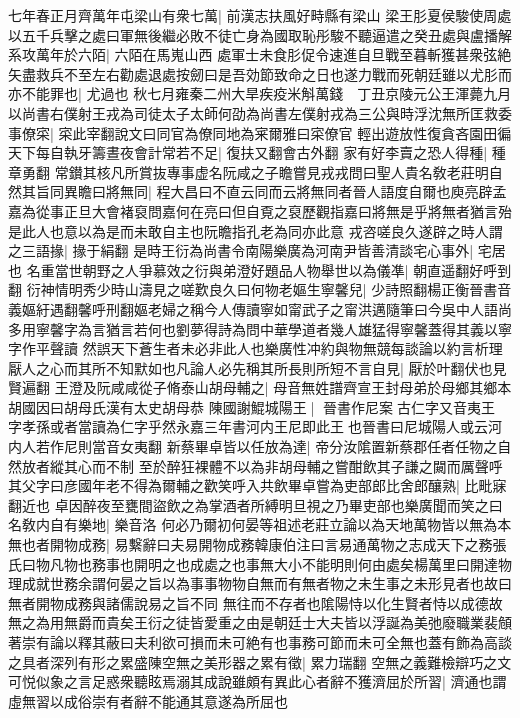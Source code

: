 七年春正月齊萬年屯梁山有衆七萬|{
	前漢志扶風好畤縣有梁山}
梁王肜夏侯駿使周處以五千兵擊之處曰軍無後繼必敗不徒亡身為國取恥彤駿不聽逼遣之癸丑處與盧播解系攻萬年於六陌|{
	六陌在馬嵬山西}
處軍士未食肜促令速進自旦戰至暮斬獲甚衆弦絶矢盡救兵不至左右勸處退處按劒曰是吾効節致命之日也遂力戰而死朝廷雖以尤肜而亦不能罪也|{
	尤過也}
秋七月雍秦二州大旱疾疫米斛萬錢　丁丑京陵元公王渾薨九月以尚書右僕射王戎為司徒太子太師何劭為尚書左僕射戎為三公與時浮沈無所匡救委事僚寀|{
	寀此宰翻說文曰同官為僚同地為宷爾雅曰寀僚官}
輕出遊放性復貪吝園田徧天下每自執牙籌晝夜會計常若不足|{
	復扶又翻會古外翻}
家有好李賣之恐人得種|{
	種章勇翻}
常鑚其核凡所賞抜專事虚名阮咸之子瞻嘗見戎戎問曰聖人貴名敎老莊明自然其旨同異瞻曰將無同|{
	程大昌曰不直云同而云將無同者晉人語度自爾也庾亮辟孟嘉為從事正旦大會褚裒問嘉何在亮曰但自覔之裒歷觀指嘉曰將無是乎將無者猶言殆是此人也意以為是而未敢自主也阮瞻指孔老為同亦此意}
戎咨嗟良久遂辟之時人謂之三語掾|{
	掾于絹翻}
是時王衍為尚書令南陽樂廣為河南尹皆善清談宅心事外|{
	宅居也}
名重當世朝野之人爭慕效之衍與弟澄好題品人物舉世以為儀凖|{
	朝直遥翻好呼到翻}
衍神情明秀少時山濤見之嗟歎良久曰何物老嫗生寧馨兒|{
	少詩照翻楊正衡晉書音義嫗紆遇翻馨呼刑翻嫗老婦之稱今人傳讀寧如甯武子之甯洪邁隨筆曰今吳中人語尚多用寧馨字為言猶言若何也劉夢得詩為問中華學道者幾人雄猛得寧馨蓋得其義以寧字作平聲讀}
然誤天下蒼生者未必非此人也樂廣性冲約與物無競每談論以約言析理厭人之心而其所不知默如也凡論人必先稱其所長則所短不言自見|{
	厭於叶翻伏也見賢遍翻}
王澄及阮咸咸從子脩泰山胡母輔之|{
	母音無姓譜齊宣王封母弟於母鄉其鄉本胡國因曰胡母氏漢有太史胡母恭}
陳國謝鯤城陽王|{
	晉書作尼案古仁字又音夷王字孝孫或者當讀為仁字乎然永嘉三年書河内王尼即此王也晉書曰尼城陽人或云河内人若作尼則當音女夷翻}
新蔡畢卓皆以任放為達|{
	帝分汝隂置新蔡郡任者任物之自然放者縱其心而不制}
至於醉狂裸體不以為非胡母輔之嘗酣飲其子謙之闚而厲聲呼其父字曰彦國年老不得為爾輔之歡笑呼入共飲畢卓嘗為吏部郎比舍郎釀熟|{
	比毗寐翻近也}
卓因醉夜至甕間盜飲之為掌酒者所縛明旦視之乃畢吏部也樂廣聞而笑之曰名敎内自有樂地|{
	樂音洛}
何必乃爾初何晏等祖述老莊立論以為天地萬物皆以無為本無也者開物成務|{
	易繫辭曰夫易開物成務韓康伯注曰言易通萬物之志成天下之務張氏曰物凡物也務事也開明之也成處之也事無大小不能明則何由處矣楊萬里曰開達物理成就世務余謂何晏之旨以為事事物物自無而有無者物之未生事之未形見者也故曰無者開物成務與諸儒說易之旨不同}
無往而不存者也隂陽恃以化生賢者恃以成德故無之為用無爵而貴矣王衍之徒皆愛重之由是朝廷士大夫皆以浮誕為美弛廢職業裴頠著崇有論以釋其蔽曰夫利欲可損而未可絶有也事務可節而未可全無也蓋有飾為高談之具者深列有形之累盛陳空無之美形器之累有徵|{
	累力瑞翻}
空無之義難檢辯巧之文可悦似象之言足惑衆聽眩焉溺其成說雖頗有異此心者辭不獲濟屈於所習|{
	濟通也謂虛無習以成俗崇有者辭不能通其意遂為所屈也}
